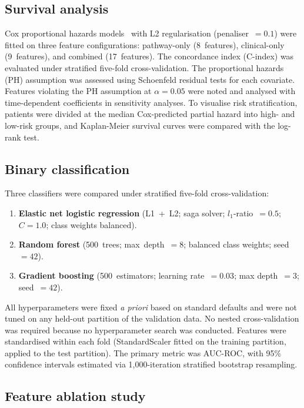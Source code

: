\documentclass[review,12pt]{elsarticle}
\begin{document}
\subsection{Survival analysis}
\label{sec:survival}

Cox proportional hazards models~\citep{cox1972} with L2 regularisation
(penaliser~$= 0.1$) were fitted on three feature configurations:
pathway-only (8~features), clinical-only (9~features), and combined
(17~features).  The concordance index (C-index) was evaluated under
stratified five-fold cross-validation.  The proportional hazards (PH)
assumption was assessed using Schoenfeld residual tests for each
covariate.  Features violating the PH assumption at $\alpha = 0.05$
were noted and analysed with time-dependent coefficients in sensitivity
analyses.  To visualise risk stratification, patients were divided at the
median Cox-predicted partial hazard into high- and low-risk groups, and
Kaplan-Meier survival curves were compared with the log-rank test.

\subsection{Binary classification}
\label{sec:classification}

Three classifiers were compared under stratified five-fold
cross-validation:

\begin{enumerate}
\item \textbf{Elastic net logistic regression} (L1~+~L2; saga solver;
      $l_1$-ratio~$= 0.5$; $C = 1.0$; class weights balanced).
\item \textbf{Random forest} (500~trees; max~depth~$=8$; balanced class weights; seed~$=42$).
\item \textbf{Gradient boosting} (500~estimators; learning rate~$=0.03$; max depth~$=3$; seed~$=42$).
\end{enumerate}

All hyperparameters were fixed \emph{a priori} based on standard defaults
and were not tuned on any held-out partition of the validation data.  No
nested cross-validation was required because no hyperparameter search was
conducted.  Features were standardised within each fold (StandardScaler
fitted on the training partition, applied to the test partition).  The
primary metric was AUC-ROC, with 95\% confidence intervals estimated via
1,000-iteration stratified bootstrap resampling.

\subsection{Feature ablation study}
\label{sec:ablation}
\end{document}
